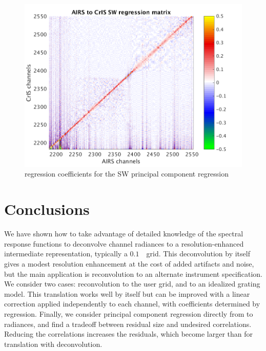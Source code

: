 \documentclass[10pt,twocolumn]{article}  %
\begin{document}
\begin{figure} %
  \centering
  \includegraphics[width=\linewidth]{slackfigs/SW_pc_regr_mat.png}
  \caption{regression coefficients for the SW principal component
    regression}
  \label{dreg9}
\end{figure}

\FloatBarrier
\section{Conclusions}
\label{appcon}

We have shown how to take advantage of detailed knowledge of the
{\airs} spectral response functions to deconvolve channel radiances
to a resolution-enhanced intermediate representation, typically a
$0.1$~\wn\ grid.  This deconvolution by itself gives a modest
resolution enhancement at the cost of added artifacts and noise, but
the main application is reconvolution to an alternate instrument
specification.  We consider two cases: reconvolution to the {\cris}
user grid, and to an idealized grating model.  This translation
works well by itself but can be improved with a linear correction
applied independently to each channel, with coefficients determined
by regression.  Finally, we consider principal component regression
directly from {\airs} to {\cris} radiances, and find a tradeoff
between residual size and undesired correlations.  Reducing the
correlations increases the residuals, which become larger than for
translation with deconvolution.
\end{document}
